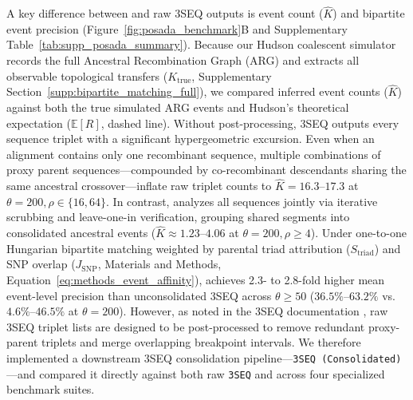 A key difference between \RhizAeon and raw 3SEQ outputs is event count ($\hat{K}$) and bipartite event precision (Figure~\ref{fig:posada_benchmark}B and Supplementary Table~\ref{tab:supp_posada_summary}). Because our Hudson coalescent simulator records the full Ancestral Recombination Graph (ARG) and extracts all observable topological transfers ($K_{\mathrm{true}}$, Supplementary Section~\ref{supp:bipartite_matching_full}), we compared inferred event counts ($\hat{K}$) against both the true simulated ARG events and Hudson's theoretical expectation ($\mathbb{E}[R]$, dashed line). Without post-processing, 3SEQ outputs every sequence triplet with a significant hypergeometric excursion. Even when an alignment contains only one recombinant sequence, multiple combinations of proxy parent sequences—compounded by co-recombinant descendants sharing the same ancestral crossover—inflate raw triplet counts to $\hat{K} = 16.3\text{--}17.3$ at $\theta = 200, \rho \in \{16, 64\}$. In contrast, \RhizAeon analyzes all sequences jointly via iterative scrubbing and leave-one-in verification, grouping shared segments into consolidated ancestral events ($\hat{K} \approx 1.23\text{--}4.06$ at $\theta = 200, \rho \ge 4$). Under one-to-one Hungarian bipartite matching weighted by parental triad attribution ($S_{\mathrm{triad}}$) and SNP overlap ($J_{\mathrm{SNP}}$, Materials and Methods, Equation~\ref{eq:methods_event_affinity}), \RhizAeon achieves 2.3- to 2.8-fold higher mean event-level precision than unconsolidated 3SEQ across $\theta \ge 50$ ($36.5\%\text{--}63.2\%$ vs.\ $4.6\%\text{--}46.5\%$ at $\theta = 200$). However, as noted in the 3SEQ documentation \citep{boni2007exact,lam20183seq}, raw 3SEQ triplet lists are designed to be post-processed to remove redundant proxy-parent triplets and merge overlapping breakpoint intervals. We therefore implemented a downstream 3SEQ consolidation pipeline—\texttt{3SEQ (Consolidated)}—and compared it directly against both raw \texttt{3SEQ} and \RhizAeon across four specialized benchmark suites.

